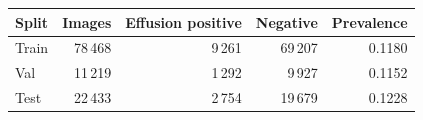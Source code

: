 \begin{tabular}{lrrrr}
\toprule
Split & Images & Effusion positive & Negative & Prevalence \\
\midrule
Train & 78\,468 & 9\,261 & 69\,207 & 0.1180 \\
Val & 11\,219 & 1\,292 & 9\,927 & 0.1152 \\
Test & 22\,433 & 2\,754 & 19\,679 & 0.1228 \\
\bottomrule
\end{tabular}
